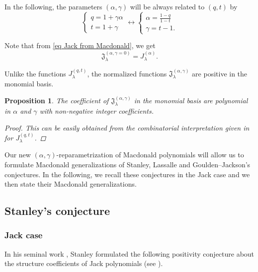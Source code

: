 \documentclass[12pt]{amsart}
\newtheorem{prop}[thm]{Proposition}
\theoremstyle{remark}
\newcommand{\J}{{J}^{(q,t)}}
\newcommand{\JJack}{{\mathfrak J}^{(\alpha,\gamma)}}
\begin{document}
In the following, the parameters $(\alpha,\gamma)$ will be always related to $(q,t)$ by
\begin{equation}\label{eq parametrization}
  \left\{\begin{array}{ll}
   q=1+\gamma\alpha  \\
   t=1+\gamma 
\end{array}\right. \longleftrightarrow 
\left\{\begin{array}{ll}
   \alpha=\frac{1-q}{1-t}  \\
   \gamma=t-1.
\end{array}\right.  
\end{equation}

Note that from \cref{eq Jack from Macdonald}, we get 
\begin{equation}\label{eq Macdonald-Jack}
  \mathfrak J^{(\alpha,\gamma=0)}_\lambda=J^{(\alpha)}_\lambda.  
\end{equation}

Unlike the functions $\J_\lambda$, the normalized functions $\JJack_\lambda$ are positive in the monomial basis.

\begin{prop}
    The coefficient of $\JJack_\lambda$ in the monomial basis are polynomial in $\alpha$ and $\gamma$ with non-negative integer coefficients.
    \begin{proof}
        This can be easily obtained from the combinatorial interpretation given in \cite[Proposition 8.1]{HaglundHaimanLoehr2005} for $\J_\lambda$.
    \end{proof}
\end{prop}

Our new $(\alpha,\gamma)$-reparametrization of Macdonald polynomials will allow us to formulate Macdonald generalizations of Stanley, Lassalle and Goulden--Jackson's conjectures. In the following, we recall these conjectures in the Jack case and we then state their Macdonald generalizations.

\subsection{Stanley's conjecture}\label{sec stanley conj}

\subsubsection{Jack case}
In his seminal work \cite{Stanley1989}, Stanley formulated the following positivity conjecture about the structure coefficients of Jack polynomials (see \cite[Conjecture 8.5]{Stanley1989}).
\end{document}
